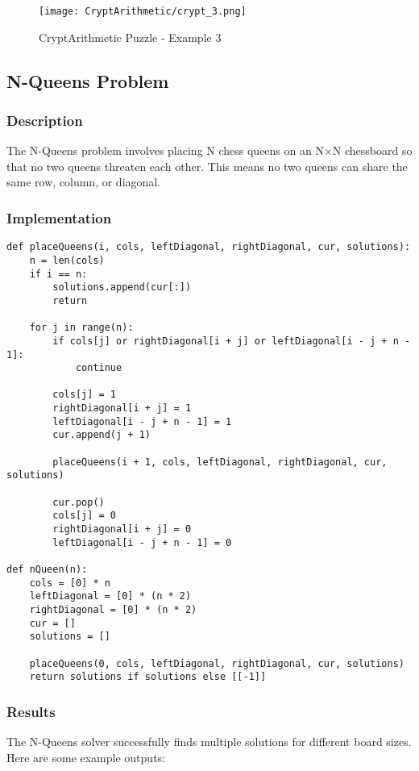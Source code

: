 \documentclass[11pt,a4paper]{article}
\begin{document}
\begin{figure}[H]
    \centering
    \texttt{[image: CryptArithmetic/crypt\_3.png]}
    \caption{CryptArithmetic Puzzle - Example 3}
\end{figure}

\subsection{N-Queens Problem}

\subsubsection{Description}
The N-Queens problem involves placing N chess queens on an N×N chessboard so that no two queens threaten each other. This means no two queens can share the same row, column, or diagonal.

\subsubsection{Implementation}
\begin{lstlisting}[caption=N-Queens Problem Implementation]
def placeQueens(i, cols, leftDiagonal, rightDiagonal, cur, solutions):
    n = len(cols)
    if i == n:
        solutions.append(cur[:])
        return

    for j in range(n):
        if cols[j] or rightDiagonal[i + j] or leftDiagonal[i - j + n - 1]:
            continue

        cols[j] = 1
        rightDiagonal[i + j] = 1
        leftDiagonal[i - j + n - 1] = 1
        cur.append(j + 1)

        placeQueens(i + 1, cols, leftDiagonal, rightDiagonal, cur, solutions)

        cur.pop()
        cols[j] = 0
        rightDiagonal[i + j] = 0
        leftDiagonal[i - j + n - 1] = 0

def nQueen(n):
    cols = [0] * n
    leftDiagonal = [0] * (n * 2)
    rightDiagonal = [0] * (n * 2)
    cur = []
    solutions = []

    placeQueens(0, cols, leftDiagonal, rightDiagonal, cur, solutions)
    return solutions if solutions else [[-1]]
\end{lstlisting}

\subsubsection{Results}
The N-Queens solver successfully finds multiple solutions for different board sizes. Here are some example outputs:
\end{document}
